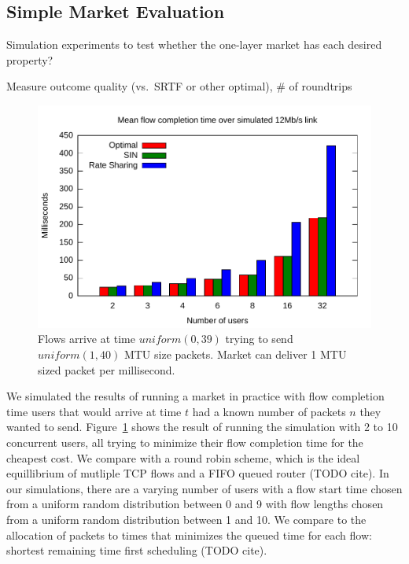 \subsection{Simple Market Evaluation}

Simulation experiments to test whether the one-layer market has each desired property?

Measure outcome quality (vs.~SRTF or other optimal), \# of roundtrips

\begin{figure}
\includegraphics[width=\columnwidth]{plots/delay_over_srtf.pdf}
\caption{Flows arrive at time $uniform(0, 39)$ trying to send $uniform(1, 40)$ MTU size packets. Market can deliver 1 MTU sized packet per millisecond.}
\label{f:delay_over_srtf}
\end{figure}

We simulated the results of running a market in practice with flow completion time users that would arrive at time $t$ had a known number of packets $n$ they wanted to send.
Figure~\ref{f:delay_over_srtf} shows the result of running the simulation with 2 to 10 concurrent users, all trying to minimize their flow completion time for the cheapest cost.
We compare with a round robin scheme, which is the ideal equillibrium of mutliple TCP flows and a FIFO queued router (TODO cite).
In our simulations, there are a varying number of users with a flow start time chosen from a uniform random distribution between 0 and 9 with flow lengths chosen from a uniform random distribution between 1 and 10. We compare to the allocation of packets to times that minimizes the queued time for each flow: shortest remaining time first scheduling (TODO cite).

